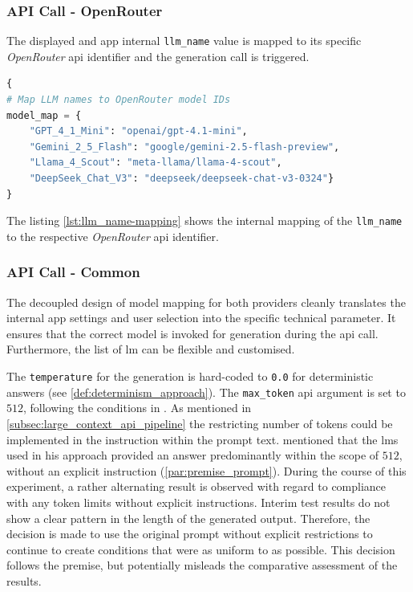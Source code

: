\subsubsection{API Call - OpenRouter}\label{subsub:api_call_common_OR}
The displayed and app internal \texttt{llm\_name} value is mapped to its specific \textit{OpenRouter} \ac{api} identifier and the generation call is triggered.
%
\begin{lstlisting}[language=Python, caption={Mapping of Models Names - App Internal to API}, label={lst:llm_name-mapping}]
{
# Map LLM names to OpenRouter model IDs
model_map = {
    "GPT_4_1_Mini": "openai/gpt-4.1-mini",
    "Gemini_2_5_Flash": "google/gemini-2.5-flash-preview",
    "Llama_4_Scout": "meta-llama/llama-4-scout",
    "DeepSeek_Chat_V3": "deepseek/deepseek-chat-v3-0324"}
}
\end{lstlisting}
The listing \cref{lst:llm_name-mapping} shows the internal mapping of the \texttt{llm\_name} to the respective \textit{OpenRouter} \ac{api} identifier.
%
\subsubsection{API Call - Common}\label{subsub:api_call_common}

The decoupled design of model mapping for both providers cleanly translates the internal app settings and user selection into the specific technical parameter.
It ensures that the correct model is invoked for generation during the \ac{api} call.
Furthermore, the list of \ac{lm} can be flexible and customised.

The \texttt{temperature} for the generation is hard-coded to \texttt{0.0} for deterministic answers (see \cref{def:determinism_approach}).
The \texttt{max\_token} \ac{api} argument is set to $512$, following the conditions in \cite{Paul_Keller}.
As mentioned in \cref{subsec:large_context_api_pipeline} the restricting number of tokens could be implemented in the instruction within the prompt text.
\cite{Paul_Keller} mentioned that the \acp{lm} used in his approach provided an answer predominantly within the scope of $512$, without an explicit instruction (\cref{par:premise_prompt}).
During the course of this experiment, a rather alternating result is observed with regard to compliance with any token limits without explicit instructions.
Interim test results do not show a clear pattern in the length of the generated output.
Therefore, the decision is made to use the original prompt without explicit restrictions to continue to create conditions that were as uniform to \cite{Paul_Keller} as possible.
This decision follows the premise, but potentially misleads the comparative assessment of the results.
%
